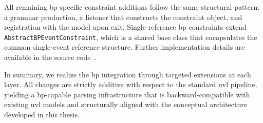 All remaining \gls{bp}-specific constraint additions follow the same structural pattern: a grammar production, a listener that constructs the constraint object, and registration with the model upon exit.
Single-reference \gls{bp} constraints extend \texttt{AbstractBPEventConstraint}, which is a shared base class that encapsulates the common single-event reference structure.
Further implementation details are available in the source code~\cite{ruider_xxnicksdaxxma-nick-ruider_2026}.

In summary, we realize the \gls{bp} integration through targeted extensions at each layer.
All changes are strictly additive with respect to the standard \gls{uvl} pipeline, yielding a \gls{bp}-capable parsing infrastructure that is backward-compatible with existing \gls{uvl} models and structurally aligned with the conceptual architecture developed in this thesis.